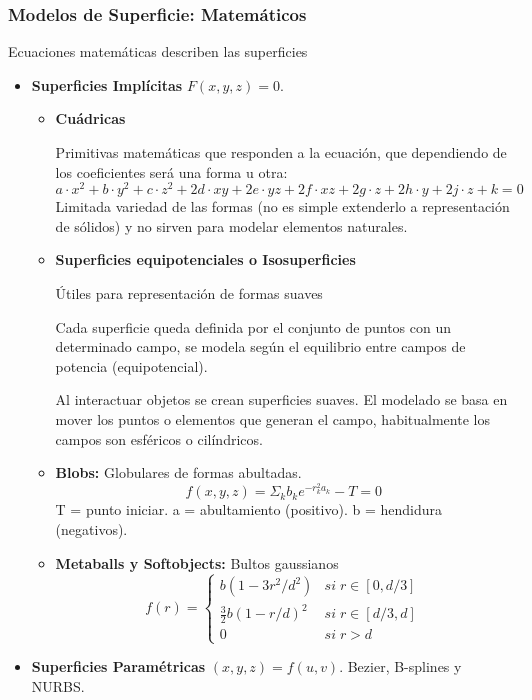 \subsubsection{Modelos de Superficie: Matemáticos}
Ecuaciones matemáticas describen las superficies
\begin{itemize}
    \item \textbf{Superficies Implícitas} $F( x, y, z) = 0$. 
    \begin{itemize}
        \item \textbf{Cuádricas}
        
        Primitivas matemáticas que responden a la ecuación, que dependiendo de los coeficientes será una forma u otra:
        $$a\cdot x^2+b\cdot y^2+c\cdot z^2+2d\cdot xy+2e\cdot yz+2f\cdot xz+2g\cdot z+2h\cdot y+2j\cdot z+k=0$$
        Limitada variedad de las formas (no es simple extenderlo a representación de sólidos) y no sirven para modelar elementos naturales.

        \item \textbf{Superficies equipotenciales o Isosuperficies}
        
        Útiles para representación de formas suaves

        Cada superficie queda definida por el conjunto de puntos con un determinado campo, se modela según el equilibrio entre campos de potencia (equipotencial).

        Al interactuar objetos se crean superficies suaves. El modelado se basa en mover los puntos o elementos que generan el campo, habitualmente los campos son esféricos o cilíndricos.

        \item \textbf{Blobs:} Globulares de formas abultadas.
        $$f(x,y,z)=\Sigma_k b_k e^{-r_k^2a_k}-T=0$$
        T = punto iniciar. a = abultamiento (positivo). b = hendidura (negativos).
        \item \textbf{Metaballs y Softobjects:} Bultos gaussianos
        $$f(r)=\begin{cases}b(1-3r^2/d^2) & si\; r \in [0,d/3]\\ \frac 3 2 b(1-r/d)^2 & si\; r \in [d/3,d] \\ 0 & si\; r>d\end{cases}$$
    \end{itemize} 
    \item \textbf{Superficies Paramétricas} $( x, y, z) = f( u, v)$. Bezier, B-splines y NURBS.
    

\end{itemize}
